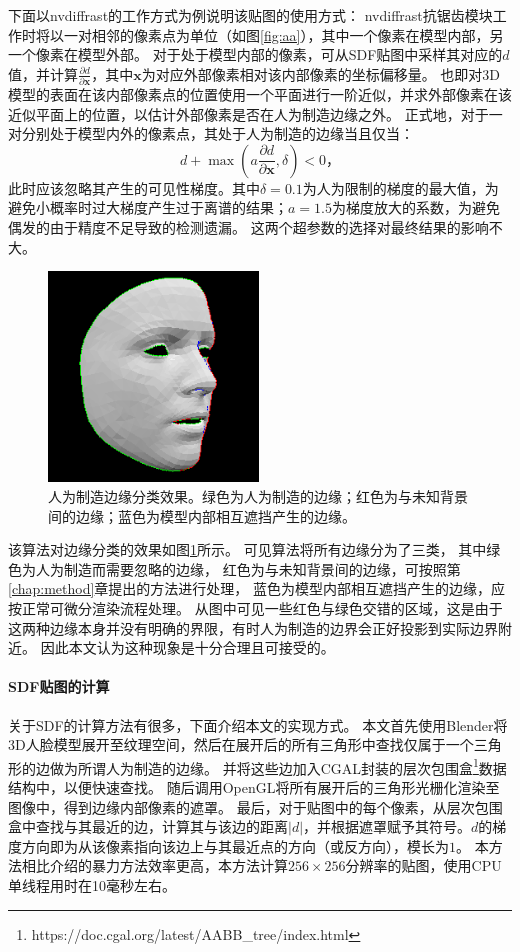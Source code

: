 下面以nvdiffrast的工作方式为例说明该贴图的使用方式：
nvdiffrast抗锯齿模块工作时将以一对相邻的像素点为单位（如图\ref{fig:aa}），其中一个像素在模型内部，另一个像素在模型外部。
对于处于模型内部的像素，可从SDF贴图中采样其对应的$d$值，并计算$\frac{\partial d}{\partial \mathbf{x}}$，其中$\mathbf{x}$为对应外部像素相对该内部像素的坐标偏移量。
也即对3D模型的表面在该内部像素点的位置使用一个平面进行一阶近似，并求外部像素在该近似平面上的位置，以估计外部像素是否在人为制造边缘之外。
正式地，对于一对分别处于模型内外的像素点，其处于人为制造的边缘当且仅当：
\begin{equation}
    d + \max\left(a\frac{\partial d}{\partial \mathbf{x}}, \delta\right) < 0
    \text{，}
\end{equation}
此时应该忽略其产生的可见性梯度。其中$\delta=0.1$为人为限制的梯度的最大值，为避免小概率时过大梯度产生过于离谱的结果；$a=1.5$为梯度放大的系数，为避免偶发的由于精度不足导致的检测遗漏。
这两个超参数的选择对最终结果的影响不大。

\begin{figure}
\centering
\includegraphics[height=2.2in]{figures/debug_sdf}
\caption[人为制造边缘分类效果]{人为制造边缘分类效果。绿色为人为制造的边缘；红色为与未知背景间的边缘；蓝色为模型内部相互遮挡产生的边缘。}
\label{fig:sdf_result}
\end{figure}

该算法对边缘分类的效果如图\ref{fig:sdf_result}所示。
可见算法将所有边缘分为了三类，
其中绿色为人为制造而需要忽略的边缘，
红色为与未知背景间的边缘，可按照第\ref{chap:method}章提出的方法进行处理，
蓝色为模型内部相互遮挡产生的边缘，应按正常可微分渲染流程处理。
从图中可见一些红色与绿色交错的区域，这是由于这两种边缘本身并没有明确的界限，有时人为制造的边界会正好投影到实际边界附近。
因此本文认为这种现象是十分合理且可接受的。

\paragraph{SDF贴图的计算}
关于SDF的计算方法有很多，下面介绍本文的实现方式。
本文首先使用Blender将3D人脸模型展开至纹理空间，然后在展开后的所有三角形中查找仅属于一个三角形的边做为所谓人为制造的边缘。
并将这些边加入CGAL封装的层次包围盒\footnote{https://doc.cgal.org/latest/AABB\_tree/index.html}数据结构中，以便快速查找。
随后调用OpenGL将所有展开后的三角形光栅化渲染至图像中，得到边缘内部像素的遮罩。
最后，对于贴图中的每个像素，从层次包围盒中查找与其最近的边，计算其与该边的距离$|d|$，并根据遮罩赋予其符号。$d$的梯度方向即为从该像素指向该边上与其最近点的方向（或反方向），模长为$1$。
本方法相比\citet{sdf_glyphs}介绍的暴力方法效率更高，本方法计算$256\times256$分辨率的贴图，使用CPU单线程用时在10毫秒左右。

